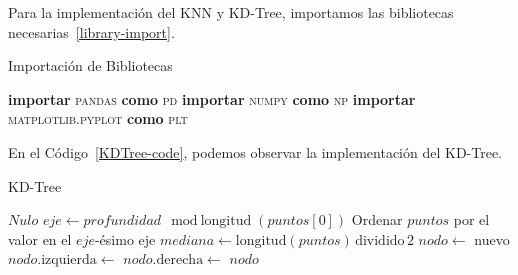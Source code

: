 \documentclass{article}
\begin{document}
\begin{sloppypar}
\vspace{0.7cm} 
Para la implementación del KNN y KD-Tree, importamos las bibliotecas necesarias~\ref{library-import}.
\begin{algorithm}[H]
\caption{Importación de Bibliotecas}
\label{library-import}
\begin{algorithmic}
\State \textbf{importar} \textsc{pandas} \textbf{como} \textsc{pd}
\State \textbf{importar} \textsc{numpy} \textbf{como} \textsc{np}
\State \textbf{importar} \textsc{matplotlib.pyplot} \textbf{como} \textsc{plt}
\end{algorithmic}
\end{algorithm}

En el Código~\ref{KDTree-code}, podemos observar la implementación del KD-Tree.
\begin{algorithm}[H]
\caption{KD-Tree}
\label{KDTree-code}
\begin{algorithmic}
        \State \Return $Nulo$
    \EndIf
    \State $eje \gets profundidad \mod \text{longitud}(puntos[0])$
    \State Ordenar $puntos$ por el valor en el $eje$-ésimo eje
    \State $mediana \gets \text{longitud}(puntos) \, \text{dividido} \, 2$
    \State $nodo \gets$ nuevo 
    \State $nodo.\text{izquierda} \gets$ 
    \State $nodo.\text{derecha} \gets$ 
    \State \Return $nodo$
\EndFunction
\end{algorithmic}
\end{algorithm}


\end{sloppypar}
\end{document}
